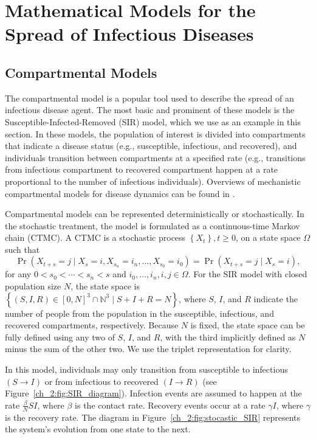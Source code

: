\section{Mathematical Models for the Spread of Infectious Diseases}
\label{sec:math_models}

\subsection{Compartmental Models}
\label{ch_2:sec:compartmental_models}
The compartmental model is a popular tool used to describe the spread of an infectious disease agent.
The most basic and prominent of these models is the Susceptible-Infected-Removed (SIR) model, which we use as an example in this section.
In these models, the population of interest is divided into compartments that indicate a disease status (e.g., susceptible, infectious, and recovered), and individuals transition between compartments at a specified rate
(e.g., transitions from infectious compartment to recovered compartment happen at a rate proportional to the number of infectious individuals).
Overviews of mechanistic compartmental models for disease dynamics can be found in \citep{anderson1992infectious, Brauer2008, keeling2011modeling, 10.1093/aje/kww021}.

Compartmental models can be represented deterministically or stochastically.
In the stochastic treatment, the model is formulated as a continuous-time Markov chain (CTMC).
A CTMC is a stochastic process \( \left\{ X_t \right\}, t \geq 0 \), on a state space \( \Omega \) such that
\begin{equation}
    \Pr\left( X_{t + s} = j\mid X_s = i, X_{s_n} = i_n, \ldots, X_{s_0} = i_0 \right) = \Pr \left( X_{t+s} = j \mid X_s = i\right),
\end{equation}
for any \(0 <  s_0 < \cdots < s_n < s \) and \( i_0, \ldots, i_n, i, j \in \Omega \).
For the SIR model with closed population size \( N \), the state space is \( \left\{ (S, I, R) \in \left[ 0, N \right]^3 \cap \mathbb{N}^3 \mid S + I + R = N\right\} \), where \( S \), \( I \), and \( R \) indicate the number of people from the population in the susceptible, infectious, and recovered compartments, respectively.
Because \( N \) is fixed, the state space can be fully defined using any two of \( S \), \( I \), and \( R \), with the third implicitly defined as \( N \) minus the sum of the other two.
We use the triplet representation for clarity.

In this model, individuals may only transition from susceptible to infectious \( (S \to I) \) or from infectious to recovered \( (I \to R) \) (see Figure~\ref{ch_2:fig:SIR_diagram}).
Infection events are assumed to happen at the rate \( \frac{\beta}{N} S I \), where \( \beta \) is the contact rate.
Recovery events occur at a rate \( \gamma I \), where \( \gamma \) is the recovery rate.
The diagram in Figure~\ref{ch_2:fig:stocastic_SIR} represents the system's evolution from one state to the next.

